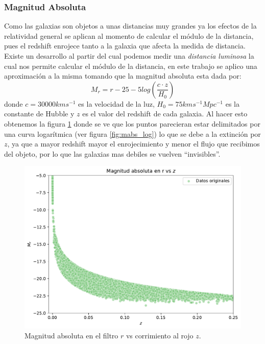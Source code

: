 \documentclass[twocolumn]{article}
\begin{document}
\subsubsection{Magnitud Absoluta}
Como las galaxias son objetos a unas distancias muy grandes ya los efectos de la relatividad general se aplican al momento de calcular el módulo de la distancia, pues el redshift enrojece tanto a la galaxia que afecta la medida de distancia. Existe un desarrollo al partir del cual podemos medir una \textit{distancia luminosa} la cual nos permite calcular el módulo de la distancia, en este trabajo se aplico una aproximación a la misma tomando que la magnitud absoluta esta dada por:
\begin{equation}
M_r= r - 25 -5log\left(\frac{c·z}{H_0}\right)
\end{equation}
donde $c=30000km s^{-1}$ es la velocidad de la luz, $H_0=75 km s^{-1}Mpc^{-1}$ es la constante de Hubble y $z$ es el valor del redshift de cada galaxia.
Al hacer esto obtenemos la figura \ref{fig:mabs} donde se ve que los puntos parecieran estar delimitados por una curva logarítmica (ver figura \ref{fig:mabs_log}) lo que se debe a la extinción por $z$, ya que a mayor redshift mayor el enrojecimiento y menor el flujo que recibimos del objeto, por lo que las galaxias mas debiles se vuelven ``invisibles''. 
\begin{figure}[t]
\includegraphics[width=\linewidth]{mabs.pdf}
\caption{Magnitud absoluta en el filtro $r$ vs corrimiento al rojo $z$.}
\label{fig:mabs}
\end{figure}
\end{document}
